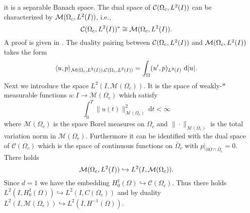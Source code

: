 it is a separable Banach space. The dual space of $\mathcal{C}(\Omega_c, L^{2}(I))$ can be characterized by $\mathcal{M}(\Omega_c, L^{2}(I))$, i.e.,
\[
\mathcal{C}(\Omega_c, L^{2}(I))^*\cong\mathcal{M}(\Omega_c, L^{2}(I)).
\]
A proof is given in \cite{Hensgen:1996}. The duality pairing between $\mathcal{C}(\Omega_c, L^{2}(I))$ and $\mathcal{M}(\Omega_c, L^{2}(I))$ takes the form
\[
\langle u,p\rangle_{\mathcal{M}(\Omega_c, L^{2}(I)),\mathcal{C}(\Omega_c, L^{2}(I))}=\int_\Omega(u',p)_{L^2(I)}~\mathrm d|u|.
\]
Next we introduce the space $L^2(I,\mathcal M(\Omega_c))$. It is the space of weakly-$*$ measurable functions $u\colon I\rightarrow \mathcal M(\Omega_c)$  which satisfy
\[
\int_0^T\|u(t)\|_{\mathcal M(\Omega_c)}^2~\mathrm dt<\infty
\]
where $\mathcal M(\Omega_c)$ is the space Borel measures on $\Omega_c$ and $\|\cdot\|_{\mathcal M(\Omega_c)}$ is the total variation norm in $\mathcal M(\Omega_c)$. Furthermore it can be identified with the dual space of $\mathcal C(\Omega_c)$ which is the space of continuous functions on $\bar \Omega_c$ with $p|_{\partial\Omega\cap \bar \Omega_c}=0$.  There holds
\begin{equation}\label{embeddingM(L2)L2(M)}
\M\hookrightarrow L^2(I,\mathcal M(\Omega_c)).
\end{equation}
Since $d=1$ we have the embedding $H^1_0(\Omega)\hookrightarrow \mathcal C(\Omega_c)$. Thus there holds $L^2(I,H^1_0(\Omega))\hookrightarrow L^2(I,C(\Omega_c))$ and by duality
$L^2(I,\mathcal M(\Omega_c))\hookrightarrow L^2(I,H^{-1}(\Omega))$.